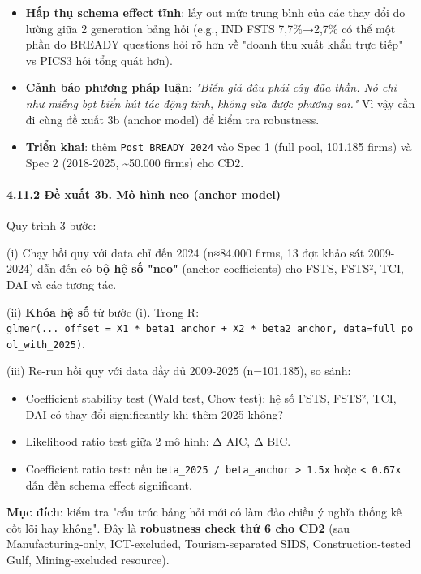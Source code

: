 \documentclass[12pt,a4paper]{article}
\providecommand{\tightlist}{\setlength{\itemsep}{0pt}\setlength{\parskip}{0pt}}
\begin{document}
\begin{itemize}
\tightlist
\item
  \textbf{Hấp thụ schema effect tĩnh}: lấy out mức trung bình của các
  thay đổi đo lường giữa 2 generation bảng hỏi (e.g., IND FSTS
  7,7\%→2,7\% có thể một phần do BREADY questions hỏi rõ hơn về "doanh
  thu xuất khẩu trực tiếp" vs PICS3 hỏi tổng quát hơn).
\item
  \textbf{Cảnh báo phương pháp luận}: \emph{"Biến giả đâu phải cây đũa
  thần. Nó chỉ như miếng bọt biển hút tác động tĩnh, không sửa được
  phương sai."} Vì vậy cần đi cùng đề xuất 3b (anchor model) để kiểm tra
  robustness.
\item
  \textbf{Triển khai}: thêm \texttt{Post\_BREADY\_2024} vào Spec 1 (full
  pool, 101.185 firms) và Spec 2 (2018-2025, \textasciitilde50.000
  firms) cho CĐ2.
\end{itemize}

\hypertarget{4112-ux111ux1ec1-xuux1ea5t-3b-muxf4-huxecnh-neo-anchor-model}{%
\paragraph{4.11.2 Đề xuất 3b. Mô hình neo (anchor
model)}\label{4112-ux111ux1ec1-xuux1ea5t-3b-muxf4-huxecnh-neo-anchor-model}}

Quy trình 3 bước:

(i) Chạy hồi quy với data chỉ đến 2024 (n≈84.000 firms, 13 đợt khảo sát
2009-2024) dẫn đến có \textbf{bộ hệ số "neo"} (anchor coefficients) cho
FSTS, FSTS², TCI, DAI và các tương tác.

(ii) \textbf{Khóa hệ số} từ bước (i). Trong R:
\texttt{glmer(...\ offset\ =\ X1\ *\ beta1\_anchor\ +\ X2\ *\ beta2\_anchor,\ data=full\_pool\_with\_2025)}.

(iii) Re-run hồi quy với data đầy đủ 2009-2025 (n=101.185), so sánh:

\begin{itemize}
\tightlist
\item
  Coefficient stability test (Wald test, Chow test): hệ số FSTS, FSTS²,
  TCI, DAI có thay đổi significantly khi thêm 2025 không?
\item
  Likelihood ratio test giữa 2 mô hình: Δ AIC, Δ BIC.
\item
  Coefficient ratio test: nếu
  \texttt{beta\_2025\ /\ beta\_anchor\ \textgreater{}\ 1.5x} hoặc
  \texttt{\textless{}\ 0.67x} dẫn đến schema effect significant.
\end{itemize}

\textbf{Mục đích}: kiểm tra "cấu trúc bảng hỏi mới có làm đảo chiều ý
nghĩa thống kê cốt lõi hay không". Đây là \textbf{robustness check thứ 6
cho CĐ2} (sau Manufacturing-only, ICT-excluded, Tourism-separated SIDS,
Construction-tested Gulf, Mining-excluded resource).
\end{document}
